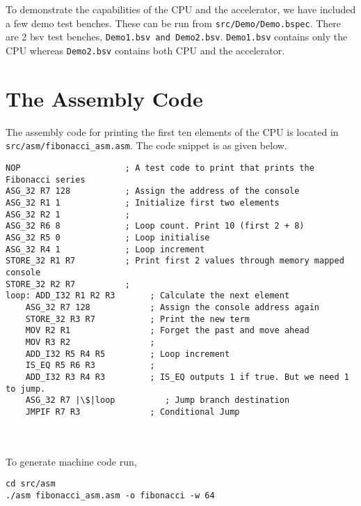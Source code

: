 \begin{paper}
\renewcommand*{\pagemark}{}

\section*{}
To demonstrate the capabilities of the CPU and the accelerator, we have included a few demo test benches. These can be run from \texttt{src/Demo/Demo.bspec}. There are 2 bsv test benches, \texttt{Demo1.bsv and Demo2.bsv}. \texttt{Demo1.bsv} contains only the CPU whereas \texttt{Demo2.bsv} contains both CPU and the accelerator. 

\section*{The Assembly Code\sdot}
The assembly code for printing the first ten elements of the CPU is located in \texttt{src/asm/fibonacci\_asm.asm}. The code snippet is as given below.
\begin{verbatim}
NOP                     ; A test code to print that prints the Fibonacci series
ASG_32 R7 128           ; Assign the address of the console
ASG_32 R1 1             ; Initialize first two elements
ASG_32 R2 1             ;
ASG_32 R6 8             ; Loop count. Print 10 (first 2 + 8)  
ASG_32 R5 0             ; Loop initialise
ASG_32 R4 1             ; Loop increment
STORE_32 R1 R7          ; Print first 2 values through memory mapped console
STORE_32 R2 R7          ;
loop: ADD_I32 R1 R2 R3       ; Calculate the next element
    ASG_32 R7 128            ; Assign the console address again
    STORE_32 R3 R7           ; Print the new term
    MOV R2 R1                ; Forget the past and move ahead
    MOV R3 R2                ; 
    ADD_I32 R5 R4 R5         ; Loop increment          
    IS_EQ R5 R6 R3           ; 
    ADD_I32 R3 R4 R3         ; IS_EQ outputs 1 if true. But we need 1 to jump.  
    ASG_32 R7 |\$|loop          ; Jump branch destination      
    JMPIF R7 R3              ; Conditional Jump
\end{verbatim}\\\\
\nointend To generate machine code run,
\begin{verbatim}
cd src/asm
./asm fibonacci_asm.asm -o fibonacci -w 64
\end{verbatim}\\\\

\end{paper}
